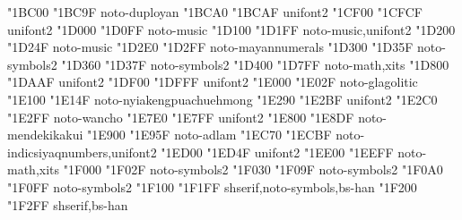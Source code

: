 \documentclass{article}
\begin{document}
                                           { "1BC00} { "1BC9F} {noto-duployan}
                          { "1BCA0} { "1BCAF} {unifont2}
                          { "1CF00} { "1CFCF} {unifont2}
                          { "1D000} { "1D0FF} {noto-music}
                                    { "1D100} { "1D1FF} {noto-music,unifont2}
                     { "1D200} { "1D24F} {noto-music}
                                     { "1D2E0} { "1D2FF} {noto-mayannumerals}
                              { "1D300} { "1D35F} {noto-symbols2}
                              { "1D360} { "1D37F} {noto-symbols2}
                  { "1D400} { "1D7FF} {noto-math,xits}
                                 { "1D800} { "1DAAF} {unifont2}
                                   { "1DF00} { "1DFFF} {unifont2}
                              { "1E000} { "1E02F} {noto-glagolitic}
                             { "1E100} { "1E14F} {noto-nyiakengpuachuehmong}
                                               { "1E290} { "1E2BF} {unifont2}
                                             { "1E2C0} { "1E2FF} {noto-wancho}
                                { "1E7E0} { "1E7FF} {unifont2}
                                      { "1E800} { "1E8DF} {noto-mendekikakui}
                                              { "1E900} { "1E95F} {noto-adlam}
                                { "1EC70} { "1ECBF} {noto-indicsiyaqnumbers,unifont2}
                              { "1ED00} { "1ED4F} {unifont2}
             { "1EE00} { "1EEFF} {noto-math,xits}
                                      { "1F000} { "1F02F} {noto-symbols2}
                                       { "1F030} { "1F09F} {noto-symbols2}
                                      { "1F0A0} { "1F0FF} {noto-symbols2}
                   { "1F100} { "1F1FF} {shserif,noto-symbols,bs-han}
                    { "1F200} { "1F2FF} {shserif,bs-han}
\end{document}
